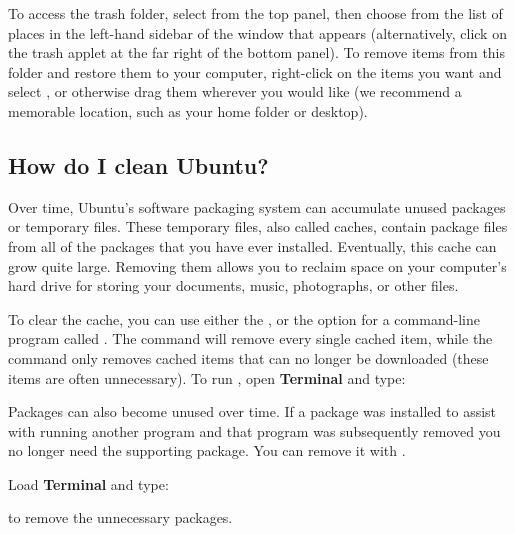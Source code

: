 To access the trash folder, select  from the top panel, then choose  from the list of places in the left-hand sidebar of the window that appears (alternatively, click on the trash applet at the far right of the bottom panel). To remove items from this folder and restore them to your computer, right-click on the items you want and select , or otherwise drag them wherever you would like (we recommend a memorable location, such as your home folder or desktop).

\subsection{How do I clean Ubuntu?}

Over time, Ubuntu's software packaging system can accumulate unused packages or temporary files. These temporary files, also called caches, contain package files from all of the packages that you have ever installed.  Eventually, this cache can grow quite large.  Removing them allows you to reclaim space on your computer's hard drive for storing your documents, music, photographs, or other files.

To clear the cache, you can use either the , or the 
option for a command-line program called . The
 command will remove every single cached item, while the
 command only removes cached items that can no longer be
downloaded (these items are often unnecessary).  To run , open \textbf{Terminal} and type:

\begin{terminal}
\prompt {}
\end{terminal}
      
Packages can also become unused over time. If a package was installed to assist
with running another program \dash and that program was subsequently removed
\dash you no longer need the supporting package.  You can remove it with .

Load \textbf{Terminal} and type:

\begin{terminal}
\prompt {}
\end{terminal}

to remove the unnecessary packages.




